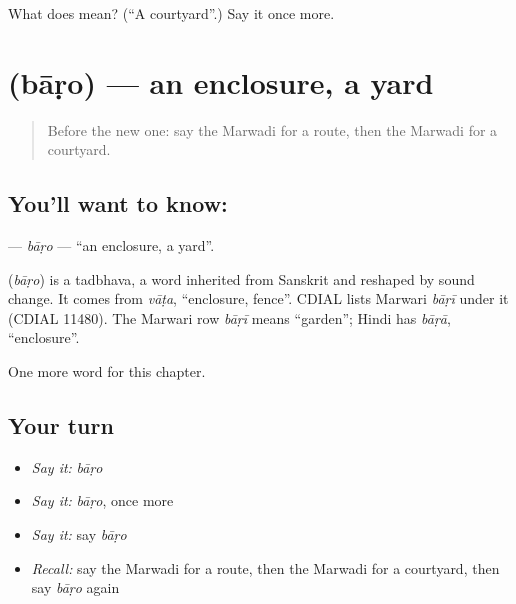 \begin{tcolorbox}[breakable,colback=teal!4,colframe=teal!35!black,title={Before you move on}]
What does  mean? (\textquotedblleft{}A courtyard\textquotedblright{}.) Say it once more.
\end{tcolorbox}
\section[\texorpdfstring{\mw{बाड़ो} (bāṛo)}{बाड़ो (bāṛo)}]{ (bāṛo) — an enclosure, a yard}

\label{lesson:MW-C99-baro}



\begin{quote}
Before the new one: say the Marwadi for a route, then the Marwadi for a courtyard.
\end{quote}

\subsection*{You'll want to know: }
\textbf{} — \emph{bāṛo} — \textquotedblleft{}an enclosure, a yard\textquotedblright{}.

\begin{cousinweb}
\textbf{} (\emph{bāṛo}) is a tadbhava, a word inherited from Sanskrit and reshaped by sound change. It comes from \emph{vāṭa}, \textquotedblleft{}enclosure, fence\textquotedblright{}. CDIAL lists Marwari \emph{bāṛī} under it (CDIAL 11480). The Marwari row \emph{bāṛī} means \textquotedblleft{}garden\textquotedblright{}; Hindi has \emph{bāṛā}, \textquotedblleft{}enclosure\textquotedblright{}.
\end{cousinweb}

\begin{grammarlens}[title={What you've built}]
One more word for this chapter.
\end{grammarlens}

\subsection*{Your turn}
\begin{itemize}
\raggedright
  \item \emph{Say it:} \emph{bāṛo}
  \item \emph{Say it:} \emph{bāṛo}, once more
  \item \emph{Say it:} say \emph{bāṛo}
  \item \emph{Recall:} say the Marwadi for a route, then the Marwadi for a courtyard, then say \emph{bāṛo} again
\end{itemize}


